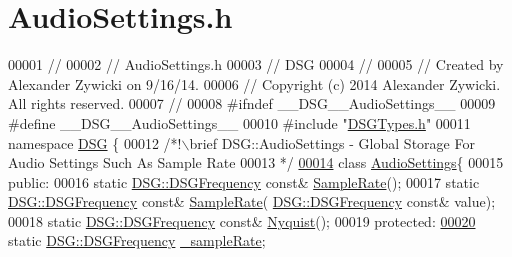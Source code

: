 \hypertarget{_audio_settings_8h_source}{\section{Audio\+Settings.\+h}
\label{_audio_settings_8h_source}
}

\begin{DoxyCode}
00001 \textcolor{comment}{//}
00002 \textcolor{comment}{//  AudioSettings.h}
00003 \textcolor{comment}{//  DSG}
00004 \textcolor{comment}{//}
00005 \textcolor{comment}{//  Created by Alexander Zywicki on 9/16/14.}
00006 \textcolor{comment}{//  Copyright (c) 2014 Alexander Zywicki. All rights reserved.}
00007 \textcolor{comment}{//}
00008 \textcolor{preprocessor}{#ifndef \_\_DSG\_\_AudioSettings\_\_}
00009 \textcolor{preprocessor}{#define \_\_DSG\_\_AudioSettings\_\_}
00010 \textcolor{preprocessor}{#include "\hyperlink{_d_s_g_types_8h}{DSGTypes.h}"}
00011 \textcolor{keyword}{namespace }\hyperlink{namespace_d_s_g}{DSG} \{\textcolor{comment}{}
00012 \textcolor{comment}{    /*!\(\backslash\)brief DSG::AudioSettings - Global Storage For Audio Settings Such As Sample Rate}
00013 \textcolor{comment}{     */}
\hypertarget{_audio_settings_8h_source_l00014}{}\hyperlink{class_d_s_g_1_1_audio_settings}{00014}     \textcolor{keyword}{class }\hyperlink{class_d_s_g_1_1_audio_settings}{AudioSettings}\{
00015     \textcolor{keyword}{public}:
00016         \textcolor{keyword}{static} \hyperlink{namespace_d_s_g_a4315a061386fa1014fda09b15d3a6973}{DSG::DSGFrequency} \textcolor{keyword}{const}& \hyperlink{class_d_s_g_1_1_audio_settings_a4f459c389b10c11828e2f2f00c012c49}{SampleRate}();
00017         \textcolor{keyword}{static} \hyperlink{namespace_d_s_g_a4315a061386fa1014fda09b15d3a6973}{DSG::DSGFrequency} \textcolor{keyword}{const}& \hyperlink{class_d_s_g_1_1_audio_settings_a4f459c389b10c11828e2f2f00c012c49}{SampleRate}(
      \hyperlink{namespace_d_s_g_a4315a061386fa1014fda09b15d3a6973}{DSG::DSGFrequency} \textcolor{keyword}{const}& value);
00018         \textcolor{keyword}{static} \hyperlink{namespace_d_s_g_a4315a061386fa1014fda09b15d3a6973}{DSG::DSGFrequency} \textcolor{keyword}{const}& \hyperlink{class_d_s_g_1_1_audio_settings_a8cb4afd7b58e927300ff46fbeb71bec7}{Nyquist}();
00019     \textcolor{keyword}{protected}:
\hypertarget{_audio_settings_8h_source_l00020}{}\hyperlink{class_d_s_g_1_1_audio_settings_a56869b51933f102b197f54001c8a1d27}{00020}         \textcolor{keyword}{static} \hyperlink{namespace_d_s_g_a4315a061386fa1014fda09b15d3a6973}{DSG::DSGFrequency} \hyperlink{class_d_s_g_1_1_audio_settings_a56869b51933f102b197f54001c8a1d27}{\_sampleRate};

\end{DoxyCode}
